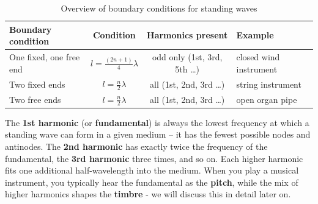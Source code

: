 \begin{table}[h]
\centering
\begin{tabular}{|l|c|c|l|}
\hline
\textbf{Boundary condition} & \textbf{Condition} & \textbf{Harmonics present} & \textbf{Example} \\
\hline
One fixed, one free end & $l = \frac{(2n+1)}{4}\lambda$ & odd only (1st, 3rd, 5th \ldots) & closed wind instrument \\
Two fixed ends          & $l = \frac{n}{2}\lambda$      & all (1st, 2nd, 3rd \ldots)      & string instrument \\
Two free ends           & $l = \frac{n}{2}\lambda$      & all (1st, 2nd, 3rd \ldots)      & open organ pipe \\
\hline
\end{tabular}
\caption{Overview of boundary conditions for standing waves}
\label{tab:boundary_conditions}
\end{table}
The \textbf{1st harmonic} (or \textbf{fundamental}) is always the lowest 
frequency at which a standing wave can form in a given medium -- it has the fewest possible 
nodes and antinodes. The \textbf{2nd harmonic} has exactly twice the frequency of the 
fundamental, the \textbf{3rd harmonic} three times, and so on. Each higher harmonic fits 
one additional half-wavelength into the medium. When you play a musical instrument, 
you typically hear the fundamental as the \textbf{pitch}, while the mix of higher harmonics 
shapes the \textbf{timbre} - we will discuss this in  detail later on. 
